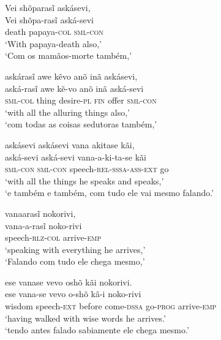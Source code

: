 \documentclass[output=paper,
modfonts,nonflat
]{langsci/langscibook}
\begin{document}
\ea Vei shõparasĩ askásevi, \\[.3em]
\gll Vei   shõpa-rasĩ         aská-sevi \\
     death papaya-\textsc{col} \textsc{sml-con}  \\
\glt `With papaya-death also,' \\
`Com os mamãos-morte também,'\\
\z

\ea askárasĩ awe kẽvo anõ inã askásevi, \\[.3em]
\gll aská-rasĩ        awe   kẽ-vo             anõ  inã   aská-sevi        \\
     \textsc{sml-col} thing desire-\textsc{pl} \textsc{fin} offer \textsc{sml-con} \\
\glt `with all the alluring things also,' \\
`com todas as coisas sedutoras também,'\\
\z

\ea askásevi askásevi vana akitase kãi, \\[.3em]
\gll aská-sevi       aská-sevi vana-a-ki-ta-se                  kãi \\
     \textsc{sml-con} \textsc{sml-con}  speech-\textsc{rel-sssa-ass-ext} go  \\
\glt `with all the things he speaks and speaks,' \\
`e também e também, com tudo ele vai mesmo falando.' \\
\z

\ea vanaarasĩ nokorivi, \\[.3em]
\gll vana-a-rasĩ             noko-rivi           \\
     speech-\textsc{rlz-col} arrive-\textsc{emp} \\
\glt `speaking with everything he arrives,' \\
`Falando com tudo ele chega mesmo,' \\
\z

\ea ese vanase vevo oshõ kãi nokorivi. \\[.3em]
\gll ese    vana-se             vevo   o-shõ              kã-i             noko-rivi           \\
     wisdom speech-\textsc{ext} before come-\textsc{dssa} go-\textsc{prog} arrive-\textsc{emp} \\
\glt `having walked with wise words he arrives.' \footnotemark \\
`tendo antes falado sabiamente ele chega mesmo.'\\
\z
\end{document}
